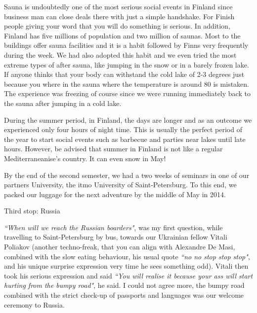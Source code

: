 \documentclass[10pt,a4paper]{article} %
\newcommand{\NewsItem}[1]{ %
\usefont{T1}{fvs}{n}{n} %
\vspace{24pt}\large #1\vspace{3pt} %
\par \normalsize \normalfont}
\begin{document}
\begin{multicols}{3}
Sauna is undoubtedly one of the most serious social events in Finland since business 
man can close deals there with just a simple handshake. 
For Finish people giving your word that you will do something is serious. 
In addition, Finland has five millions of population and two million of saunas. 
Most to the buildings offer sauna facilities and it is a habit followed by Finns 
very frequently during the week. 
We had also adopted this habit and we even tried the most extreme types of after 
sauna, like jumping in the snow or in a barely frozen lake. 
If anyone thinks that your body can withstand the cold lake of 2-3 degrees just 
because you where in the sauna where the temperature is around 80 is mistaken. 
The experience was freezing of course since we were running immediately back to the 
sauna after jumping in a cold lake.  


During the summer period, in Finland, the days are longer and as an outcome we 
experienced only four hours of night time. 
This is usually the perfect period of the year to start social events such as 
barbecue and parties near lakes until late hours. 
However, be advised that summer in Finland is not like a regular Mediterraneanise's 
country. 
It can even snow in May! 


By the end of the second semester, we had a two weeks of seminars in one of our 
partners University, the {\sc itmo} University of Saint-Petersburg. 
To this end, we packed our luggage for the next adventure by the middle of May 
in 2014.	

\NewsItem{Third stop: Russia}
%  
\textit{``When will we reach the Russian boarders"}, was my first question, while 
travelling to Saint-Petersburg by bus, towards our Ukrainian fellow Vitali 
Poliakov  (another techno-freak, that you can align with Alexandre De Masi, 
combined with the slow eating behaviour, his usual quote 
\textit{``no no stop stop stop"}, and his unique surprise expression very time 
he sees something odd). 
Vitali then took his serious expression and said \textit{``You will realise it 
	because your ass will start hurting from the bumpy road"}, he said. 
I could not agree more, the bumpy road combined with the strict check-up of 
passports and languages was our welcome ceremony to Russia.



\end{multicols}
\end{document}
